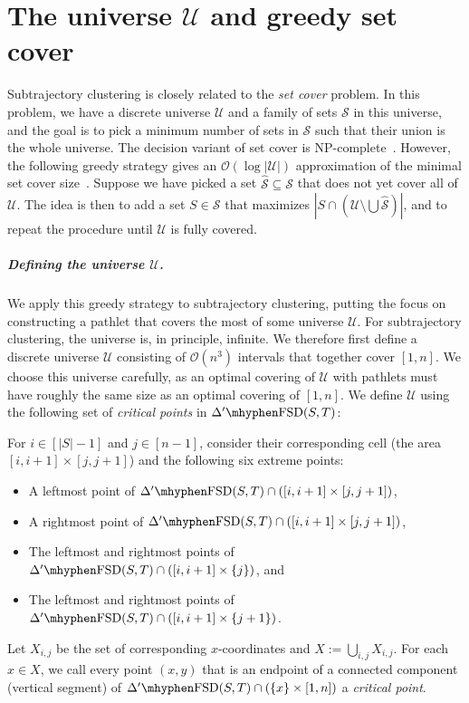 \documentclass[a4paper,UKenglish,cleveref,thm-restate,notab]{lipics-v2021}
\newcommand{\FSD}[1][\Delta'] {\ensuremath{#1}\mhyphen\mathrm{FSD}}
\newcommand{\bigO}{\mathcal{O}}
\newcommand{\U}{\mathcal{U}}
\begin{document}
\section{The universe $\U$ and greedy set cover}
\label{sec:set_cover}


 Subtrajectory clustering is closely related to the \emph{set cover} problem.
    In this problem, we have a discrete universe $\U$ and a family of sets $\mathcal{S}$ in this universe, and the goal is to pick a minimum number of sets in $\mathcal{S}$ such that their union is the whole universe.
    The decision variant of set cover is NP-complete~\cite{karp72reducibility}.
    However, the following greedy strategy gives an $\bigO(\log |\U|)$ approximation of the minimal set cover size~\cite{chvatal79greedy}.
    Suppose we have picked a set $\hat{\mathcal{S}} \subseteq \mathcal{S}$ that does not yet cover all of $\U$.
    The idea is then to add a set $S \in \mathcal{S}$ that maximizes $|S \cap (\U \setminus \bigcup \hat{\mathcal{S}})|$, and to repeat the procedure until $\U$ is fully covered.
    
    
    \subparagraph{Defining the universe $\U$.}
    We apply this greedy strategy to subtrajectory clustering, putting the focus on constructing a pathlet that covers the most of some universe $\U$.
    For subtrajectory clustering, the universe is, in principle, infinite.
    We therefore first define a discrete universe $\U$ consisting of $\bigO(n^3)$ intervals that together cover $[1, n]$.
    We choose this universe carefully, as an optimal covering of $\U$ with pathlets must have roughly the same size as an optimal covering of $[1, n]$.
    We define $\U$ using the following set of \emph{critical points} in $\FSD(S, T)$:

    \begin{definition}
    \label{def:critical_points}
        For $i \in [|S|-1]$ and $j \in [n-1]$, consider their corresponding cell (the area $[i, i+1] \times [j, j+1]$) and the following six extreme points:       
        \begin{itemize}
            \item A leftmost point of $\FSD(S, T) \cap ([i, i+1] \times [j, j+1])$,
            \item A rightmost point of $\FSD(S, T) \cap ([i, i+1] \times [j, j+1])$,
            \item The leftmost and rightmost points of $\FSD(S, T) \cap ([i, i+1] \times \{j\})$, and
            \item The leftmost and rightmost points of $\FSD(S, T) \cap ([i, i+1] \times \{j+1\})$.
        \end{itemize}
        Let $X_{i, j}$ be the set of corresponding $x$-coordinates and $X := \bigcup\limits_{i, j} X_{i, j}$.
        For each $x \in X$, we call  every point $(x, y)$ that is an endpoint of a connected component (vertical segment) of $\FSD(S, T) \cap (\{x\} \times [1, n])$ a \emph{critical point}.
    \end{definition}
\end{document}

